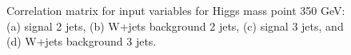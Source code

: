 \begin{figure}[bthp!]
{}


\caption{\label{fig:FigCorr350Mu} 
Correlation matrix for input variables for Higgs mass point 350 GeV:
(a) signal 2 jets, (b) W+jets background 2 jets, 
(c) signal 3 jets, and (d) W+jets background 3 jets.
}
\end{figure}
\newpage
